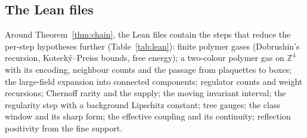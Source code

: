 \documentclass[11pt,a4paper]{article}
\theoremstyle{definition}
\theoremstyle{remark}
\begin{document}
\subsection{The Lean files}
Around Theorem~\ref{thm:chain}, the Lean files contain the steps that reduce the per-step hypotheses further (Table~\ref{tab:lean}): finite polymer gases (Dobrushin's recursion, Kotecký--Preiss bounds, free energy); a two-colour polymer gas on $\mathbb Z^4$ with its encoding, neighbour counts and the passage from plaquettes to boxes; the large-field expansion into connected components; regulator counts and weight recursions; Chernoff rarity and the supply; the moving invariant interval; the regularity step with a background Lipschitz constant; tree gauges; the class window and its sharp form; the effective coupling and its continuity; reflection positivity from the fine support.
\end{document}
